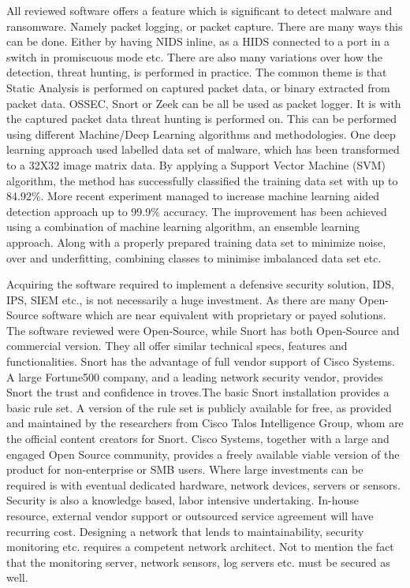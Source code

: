 
All reviewed software offers a feature which is significant to detect malware and ransomware. Namely packet logging, or packet capture. There are many ways this can be done. Either by having NIDS inline, as a HIDS connected to a port in a switch in promiscuous mode etc. There are also many variations over how the detection, threat hunting, is performed in practice. The common theme is that Static Analysis is performed on captured packet data, or binary extracted from packet data. OSSEC, Snort or Zeek can be all be used as packet logger. It is with the captured packet data threat hunting is performed on. This can be performed using different Machine/Deep Learning algorithms and methodologies. One deep learning approach used labelled data set of malware, which has been transformed to a 32X32 image matrix data. By applying a Support Vector Machine (SVM) algorithm, the method has successfully classified the training data set with up to 84.92\%\cite{322221656}. More recent experiment managed to increase machine learning aided detection approach up to 99.9\% accuracy\cite{358776502}. The improvement has been achieved using a combination of machine learning algorithm, an ensemble learning approach. Along with a properly prepared training data set to minimize noise, over and underfitting, combining classes to minimise imbalanced data set etc.

Acquiring the software required to implement a defensive security solution, IDS, IPS, SIEM etc., is not necessarily a huge investment. As there are many Open-Source software which are near equivalent with proprietary or payed solutions. The software reviewed were Open-Source, while Snort has both Open-Source and commercial version. They all offer similar technical specs, features and functionalities. Snort has the advantage of full vendor support of Cisco Systems. A large Fortune500 company, and a leading network security vendor, provides Snort the trust and confidence in troves.The basic Snort installation provides a basic rule set. A version of the rule set is publicly available for free, as provided and maintained by the researchers from Cisco Talos Intelligence Group, whom are the official content creators for Snort. Cisco Systems, together with a large and engaged Open Source community, provides a freely available viable version of the product for non-enterprise or SMB users. Where large investments can be required is with eventual dedicated hardware, network devices, servers or sensors. Security is also a knowledge based, labor intensive undertaking. In-house resource, external vendor support or outsourced service agreement will have recurring cost. Designing a network that lends to maintainability, security monitoring etc. requires a competent network architect. Not to mention the fact that the monitoring server, network sensors, log servers etc. must be secured as well.

